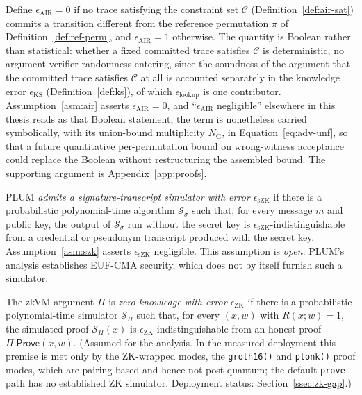 \begin{definition}\label{def:eair}
    Define $\epsilon_{\mathrm{AIR}}=0$ if no trace satisfying the constraint set $\mathcal C$ (Definition~\ref{def:air-sat}) commits a transition different from the reference permutation $\pi$ of Definition~\ref{def:ref-perm}, and $\epsilon_{\mathrm{AIR}}=1$ otherwise. The quantity is Boolean rather than statistical: whether a fixed committed trace satisfies $\mathcal C$ is deterministic, no argument-verifier randomness entering, since the soundness of the argument that the committed trace satisfies $\mathcal C$ at all is accounted separately in the knowledge error $\epsilon_{\mathrm{KS}}$ (Definition~\ref{def:ks}), of which $\epsilon_{\mathrm{lookup}}$ is one contributor. Assumption~\ref{asm:air} asserts $\epsilon_{\mathrm{AIR}}=0$, and ``$\epsilon_{\mathrm{AIR}}$ negligible'' elsewhere in this thesis reads as that Boolean statement; the term is nonetheless carried symbolically, with its union-bound multiplicity $N_{\mathrm G}$, in Equation~\eqref{eq:adv-unf}, so that a future quantitative per-permutation bound on wrong-witness acceptance could replace the Boolean without restructuring the assembled bound. The supporting argument is Appendix~\ref{app:proofs}.
\end{definition}

\begin{definition}\label{def:szk}
PLUM \emph{admits a signature-transcript simulator with error $\epsilon_{\mathrm{sZK}}$} if there is a probabilistic polynomial-time algorithm $\mathcal{S}_\sigma$ such that, for every message $m$ and public key, the output of $\mathcal{S}_\sigma$ run without the secret key is $\epsilon_{\mathrm{sZK}}$-indistinguishable from a credential or pseudonym transcript produced with the secret key. Assumption~\ref{asm:szk} asserts $\epsilon_{\mathrm{sZK}}$ negligible. This assumption is \emph{open}: PLUM's analysis establishes EUF-CMA security, which does not by itself furnish such a simulator.
\end{definition}

\begin{definition}\label{def:zk}
The zkVM argument $\Pi$ is \emph{zero-knowledge with error $\epsilon_{\mathrm{ZK}}$} if there is a probabilistic polynomial-time simulator $\mathcal{S}_\Pi$ such that, for every $(x,w)$ with $R(x;w)=1$, the simulated proof $\mathcal{S}_\Pi(x)$ is $\epsilon_{\mathrm{ZK}}$-indistinguishable from an honest proof $\Pi.\mathsf{Prove}(x,w)$. (Assumed for the analysis. In the measured deployment this premise is met only by the ZK-wrapped modes, the \texttt{groth16()} and \texttt{plonk()} proof modes, which are pairing-based and hence not post-quantum; the default \texttt{prove} path has no established ZK simulator. Deployment status: Section~\ref{ssec:zk-gap}.)
\end{definition}

